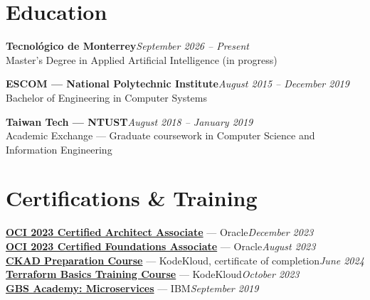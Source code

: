 \documentclass[11pt,letterpaper]{article}
\begin{document}
\section{Education}
\textbf{Tecnológico de Monterrey}\hfill\textit{September 2026 -- Present}\\
Master's Degree in Applied Artificial Intelligence (in progress)

\textbf{ESCOM --- National Polytechnic Institute}\hfill\textit{August 2015 -- December 2019}\\
Bachelor of Engineering in Computer Systems

\textbf{Taiwan Tech --- NTUST}\hfill\textit{August 2018 -- January 2019}\\
Academic Exchange --- Graduate coursework in Computer Science and Information Engineering

\section{Certifications \& Training}
{\small
\href{https://catalog-education.oracle.com/pls/certview/sharebadge?id=0BF893A36BB86FB4B248C61CB68D8E9134C7AD56DE531C8E2B84450E03023E85}{\textbf{OCI 2023 Certified Architect Associate}} --- Oracle\hfill\textit{December 2023}\\
\href{https://catalog-education.oracle.com/pls/certview/sharebadge?id=F1A5E07D4CFCFA0A93CBE1D9AFF3EE625EBD2CBB9A04A80828223B67F71EA1D2}{\textbf{OCI 2023 Certified Foundations Associate}} --- Oracle\hfill\textit{August 2023}\\
\href{https://kodekloud.com/certificate-verification/2D064B20CEA5-2D06451C4AC8-2D0644EDBDFD}{\textbf{CKAD Preparation Course}} --- KodeKloud, certificate of completion\hfill\textit{June 2024}\\
\href{https://kodekloud.com/certificate-verification/2D064B20CEA5-2D06452AEED5-2D0644EDBDFD/}{\textbf{Terraform Basics Training Course}} --- KodeKloud\hfill\textit{October 2023}\\
\href{https://drive.google.com/open?id=15vOyN0MEt5CZ6QReEKtk0ulTpDHviOR2}{\textbf{GBS Academy: Microservices}} --- IBM\hfill\textit{September 2019}
}
\end{document}
